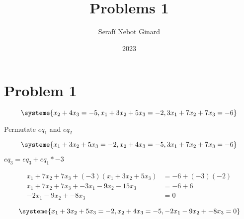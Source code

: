 \documentclass{article}
\title{Problems 1}
\author{Serafí Nebot Ginard}
\date{2023}
\begin{document}
\maketitle
\newpage

\tableofcontents
\newpage

\section{Problem 1}
\begin{equation}
  \systeme{
    x_2 + 4x_3 = -5,
    x_1 + 3x_2 + 5x_3 = -2,
    3x_1 + 7x_2 + 7x_3 = -6
  }
\end{equation}

Permutate $eq_1$ and $eq_2$

\[
  \systeme{
    x_1 + 3x_2 + 5x_3 = -2,
    x_2 + 4x_3 = -5,
    3x_1 + 7x_2 + 7x_3 = -6
  }
\]

$eq_3 = eq_3 + eq_1 * -3$

\[
  \begin{aligned}
      x_1 + 7x_2 + 7x_3 + (-3)(x_1 + 3x_2 + 5x_3) &= -6 + (-3)(-2) \\
      x_1 + 7x_2 + 7x_3 + -3x_1 - 9x_2 - 15x_3 &= -6 + 6 \\
      - 2x_1 - 9x_2 + -8x_3 &= 0
  \end{aligned}
\]

\[
  \systeme{
    x_1 + 3x_2 + 5x_3 = -2,
    x_2 + 4x_3 = -5,
    - 2x_1 - 9x_2 + -8x_3 = 0
  }
\]
\end{document}
